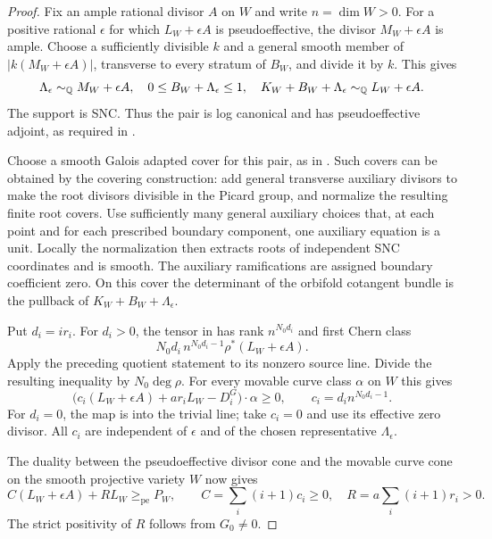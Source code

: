 \begin{proof}
Fix an ample rational divisor $A$ on $W$ and write $n=\dim W>0$.
For a positive rational $\epsilon$ for which $L_W+\epsilon A$ is
pseudoeffective, the divisor $M_W+\epsilon A$ is ample.  Choose a
sufficiently divisible $k$ and a general smooth member of
$|k(M_W+\epsilon A)|$, transverse to every stratum of $B_W$, and divide
it by $k$.  This gives
\[
  \Lambda_\epsilon\sim_{\mathbb Q}M_W+\epsilon A,
  \quad 0\le B_W+\Lambda_\epsilon\le1,
  \quad K_W+B_W+\Lambda_\epsilon\sim_{\mathbb Q}L_W+\epsilon A.
\]
The support is SNC.  Thus the pair is log canonical and has
pseudoeffective adjoint, as required in \cite[Theorem~1.3]{CP}.

Choose a smooth Galois adapted cover for this pair, as in
\cite[Definition~5.1 and Lemma~5.2]{CP}.  Such covers can be
obtained by the covering construction: add general transverse
auxiliary divisors to make the root divisors divisible in the Picard
group, and normalize the resulting finite root covers.  Use sufficiently
many general auxiliary choices that, at each point and for each
prescribed boundary component, one auxiliary equation is a unit.
Locally the normalization then extracts roots of independent SNC
coordinates and is smooth.  The auxiliary ramifications are assigned
boundary coefficient zero.  On this cover the determinant of the
orbifold cotangent bundle is the pullback of
$K_W+B_W+\Lambda_\epsilon$.

Put $d_i=ir_i$.  For $d_i>0$, the tensor in
 has rank $n^{N_0d_i}$ and first Chern
class
\[
 N_0d_i\,n^{N_0d_i-1}
             \rho^*(L_W+\epsilon A).
\]
Apply the preceding quotient statement to its nonzero source line.
Divide the resulting inequality by $N_0\deg\rho$.  For every movable
curve class $\alpha$ on $W$ this gives
\[
 \bigl(c_i(L_W+\epsilon A)+ar_iL_W-D_i^G\bigr)\cdot\alpha\ge0,
 \qquad c_i=d_i n^{N_0d_i-1}.
\]
For $d_i=0$, the map is into the trivial line; take $c_i=0$ and use
its effective zero divisor.  All $c_i$ are independent of $\epsilon$
and of the chosen representative $\Lambda_\epsilon$.

The duality between the pseudoeffective divisor cone and the movable
curve cone on the smooth projective variety $W$
\cite[Theorem~2.2]{BDPP} now gives
\begin{equation}\label{eq:nonvanishing-uniform-inequality}
 C(L_W+\epsilon A)+RL_W\ge_{\mathrm{pe}}P_W,
 \qquad
 C=\sum_i(i+1)c_i\ge0,
 \quad R=a\sum_i(i+1)r_i>0.
\end{equation}
The strict positivity of $R$ follows from $G_0\ne0$.


\end{proof}
